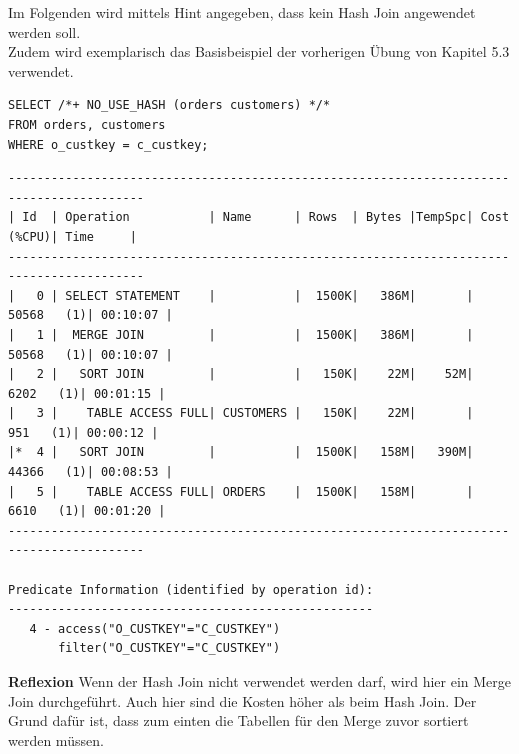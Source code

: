 \documentclass[10pt]{article}
\begin{document}
Im Folgenden wird mittels Hint angegeben, dass kein Hash Join angewendet werden soll.\\
Zudem wird exemplarisch das Basisbeispiel der vorherigen Übung von Kapitel 5.3 verwendet.
\begin{lstlisting}[style=sql]
SELECT /*+ NO_USE_HASH (orders customers) */*
FROM orders, customers
WHERE o_custkey = c_custkey;
\end{lstlisting}
\begin{lstlisting}[style=queryexecutionplan]
-----------------------------------------------------------------------------------------
| Id  | Operation           | Name      | Rows  | Bytes |TempSpc| Cost (%CPU)| Time     |
-----------------------------------------------------------------------------------------
|   0 | SELECT STATEMENT    |           |  1500K|   386M|       | 50568   (1)| 00:10:07 |
|   1 |  MERGE JOIN         |           |  1500K|   386M|       | 50568   (1)| 00:10:07 |
|   2 |   SORT JOIN         |           |   150K|    22M|    52M|  6202   (1)| 00:01:15 |
|   3 |    TABLE ACCESS FULL| CUSTOMERS |   150K|    22M|       |   951   (1)| 00:00:12 |
|*  4 |   SORT JOIN         |           |  1500K|   158M|   390M| 44366   (1)| 00:08:53 |
|   5 |    TABLE ACCESS FULL| ORDERS    |  1500K|   158M|       |  6610   (1)| 00:01:20 |
-----------------------------------------------------------------------------------------
 
Predicate Information (identified by operation id):
---------------------------------------------------
   4 - access("O_CUSTKEY"="C_CUSTKEY")
       filter("O_CUSTKEY"="C_CUSTKEY")
\end{lstlisting}
\textbf{Reflexion} \newline
Wenn der Hash Join nicht verwendet werden darf, wird hier ein Merge Join durchgeführt.
Auch hier sind die Kosten höher als beim Hash Join.
Der Grund dafür ist, dass zum einten die Tabellen für den Merge zuvor sortiert werden müssen.

\newpage
\end{document}
